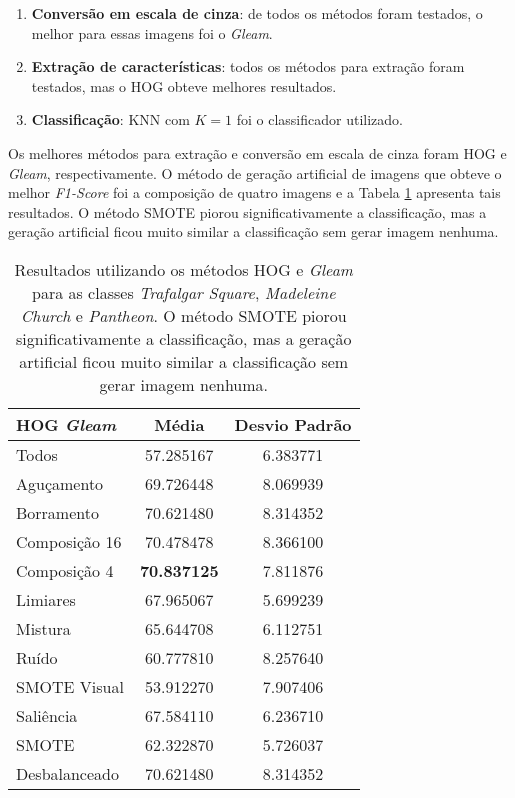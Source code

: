 \begin{enumerate}
\item \textbf{Conversão em escala de cinza}: de todos os métodos foram testados, o melhor para essas imagens foi o \emph{Gleam}.
\item \textbf{Extração de características}: todos os métodos para extração foram testados, mas o HOG obteve melhores resultados.
\item \textbf{Classificação}: KNN com $K=1$ foi o classificador utilizado.
\end{enumerate}


Os melhores métodos para extração e conversão em escala de cinza foram HOG e \emph{Gleam}, respectivamente. O método de geração artificial de imagens que obteve o melhor \textit{F1-Score} foi a composição de quatro imagens e a Tabela \ref{tab:resultados:4.2} apresenta tais resultados. O método SMOTE piorou significativamente a classificação, mas a geração artificial ficou muito similar a classificação sem gerar imagem nenhuma.

\begin{table}[H]
\begin{center}
\caption{Resultados utilizando os métodos HOG e \textit{Gleam} para as classes \textit{Trafalgar Square}, \textit{Madeleine Church} e \textit{Pantheon}. O método SMOTE piorou significativamente a classificação, mas a geração artificial ficou muito similar a classificação sem gerar imagem nenhuma.}
\label{tab:resultados:4.2}
\begin{tabular}{|l|c|c|}
\hline
\textbf{HOG \emph{Gleam}} & \textbf{Média}     & \textbf{Desvio Padrão} \\ \hline
   Todos        &  57.285167 &  6.383771  \\ \hline
  Aguçamento    &  69.726448 &  8.069939  \\ \hline
  Borramento    &  70.621480 &  8.314352  \\ \hline
  Composição 16 &  70.478478 &  8.366100  \\ \hline
  Composição 4  &  \textbf{70.837125} &  7.811876  \\ \hline
  Limiares      &  67.965067 &  5.699239  \\ \hline
  Mistura       &  65.644708 &  6.112751  \\ \hline
  Ruído         &  60.777810 &  8.257640  \\ \hline
  SMOTE Visual  &  53.912270 &  7.907406  \\ \hline
  Saliência     &  67.584110 &  6.236710  \\ \hline
 SMOTE          &  62.322870 &  5.726037  \\ \hline
Desbalanceado   &  70.621480 &  8.314352  \\ \hline
\end{tabular}
\end{center}
\end{table}

